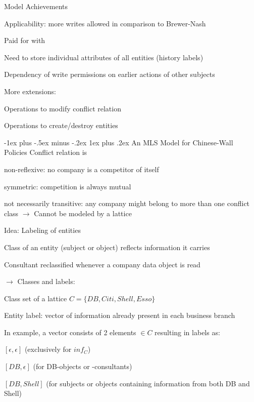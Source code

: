 \documentclass[a4paper]{article}
\makeatletter
\renewcommand{\subsubsection}{\@startsection{subsubsection}{3}{0mm}%
                {-1ex plus -.5ex minus -.2ex}%
                {1ex plus .2ex}%
                {\normalfont\small\bfseries}}
\makeatother
\begin{document}
\begin{multicols}{3}
    Model Achievements
    \begin{itemize*}
        \item Applicability: more writes allowed in comparison to Brewer-Nash
        \item Paid for with
        \begin{itemize*}
            \item Need to store individual attributes of all entities (history labels)
            \item Dependency of write permissions on earlier actions of other subjects
        \end{itemize*}
        \item More extensions:
        \begin{itemize*}
            \item Operations to modify conflict relation
            \item Operations to create/destroy entities
        \end{itemize*}
    \end{itemize*}

    \subsubsection{An MLS Model for Chinese-Wall Policies}
    Conflict relation is
    \begin{itemize*}
        \item non-reflexive: no company is a competitor of itself
        \item symmetric: competition is always mutual
        \item not necessarily transitive: any company might belong to more than one conflict class $\rightarrow$ Cannot be modeled by a lattice
    \end{itemize*}

    Idea: Labeling of entities
    \begin{itemize*}
        \item Class of an entity (subject or object) reflects information it carries
        \item Consultant reclassified whenever a company data object is read
        \item[$\rightarrow$] Classes and labels:
        \item Class set of a lattice $C=\{DB,Citi,Shell,Esso\}$
        \item Entity label: vector of information already present in each business branch
        \item In example, a vector consists of 2 elements $\in C$ resulting in labels as:
        \begin{itemize*}
            \item $[\epsilon,\epsilon]$ (exclusively for $inf_C$)
            \item $[DB,\epsilon]$ (for DB-objects or -consultants)
            \item $[DB,Shell]$ (for subjects or objects containing information from both DB and Shell)
        \end{itemize*}
    \end{itemize*}


\end{multicols}
\end{document}
